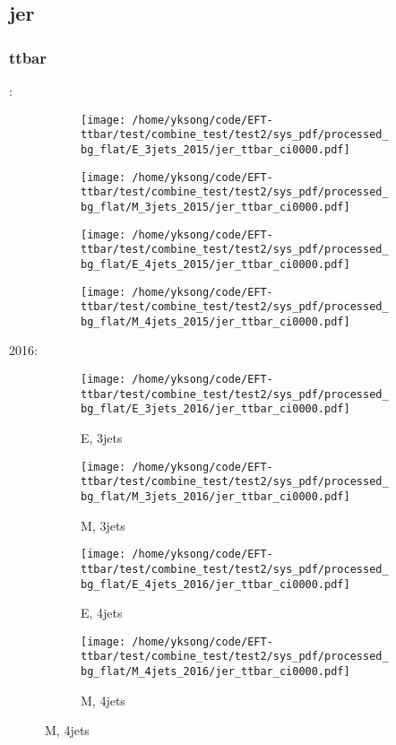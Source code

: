 \documentclass{beamer}
\begin{document}
\subsection{jer}

\begin{frame}
\frametitle{ttbar}
\fontsize{5}{1}:
\begin{figure}
\centering
\begin{subfigure}[b]{0.24\textwidth}
\texttt{[image: /home/yksong/code/EFT-ttbar/test/combine\_test/test2/sys\_pdf/processed\_bg\_flat/E\_3jets\_2015/jer\_ttbar\_ci0000.pdf]}
\end{subfigure}
\begin{subfigure}[b]{0.24\textwidth}
\texttt{[image: /home/yksong/code/EFT-ttbar/test/combine\_test/test2/sys\_pdf/processed\_bg\_flat/M\_3jets\_2015/jer\_ttbar\_ci0000.pdf]}
\end{subfigure}
\begin{subfigure}[b]{0.24\textwidth}
\texttt{[image: /home/yksong/code/EFT-ttbar/test/combine\_test/test2/sys\_pdf/processed\_bg\_flat/E\_4jets\_2015/jer\_ttbar\_ci0000.pdf]}
\end{subfigure}
\begin{subfigure}[b]{0.24\textwidth}
\texttt{[image: /home/yksong/code/EFT-ttbar/test/combine\_test/test2/sys\_pdf/processed\_bg\_flat/M\_4jets\_2015/jer\_ttbar\_ci0000.pdf]}
\end{subfigure}
\end{figure}
2016:
\begin{figure}
\centering
\begin{subfigure}[b]{0.24\textwidth}
\texttt{[image: /home/yksong/code/EFT-ttbar/test/combine\_test/test2/sys\_pdf/processed\_bg\_flat/E\_3jets\_2016/jer\_ttbar\_ci0000.pdf]}
\captionsetup{font=tiny}
\caption{E, 3jets}
\end{subfigure}
\begin{subfigure}[b]{0.24\textwidth}
\texttt{[image: /home/yksong/code/EFT-ttbar/test/combine\_test/test2/sys\_pdf/processed\_bg\_flat/M\_3jets\_2016/jer\_ttbar\_ci0000.pdf]}
\captionsetup{font=tiny}
\caption{M, 3jets}
\end{subfigure}
\begin{subfigure}[b]{0.24\textwidth}
\texttt{[image: /home/yksong/code/EFT-ttbar/test/combine\_test/test2/sys\_pdf/processed\_bg\_flat/E\_4jets\_2016/jer\_ttbar\_ci0000.pdf]}
\captionsetup{font=tiny}
\caption{E, 4jets}
\end{subfigure}
\begin{subfigure}[b]{0.24\textwidth}
\texttt{[image: /home/yksong/code/EFT-ttbar/test/combine\_test/test2/sys\_pdf/processed\_bg\_flat/M\_4jets\_2016/jer\_ttbar\_ci0000.pdf]}
\captionsetup{font=tiny}
\caption{M, 4jets}
\end{subfigure}
\end{figure}
\end{frame}
\end{document}
